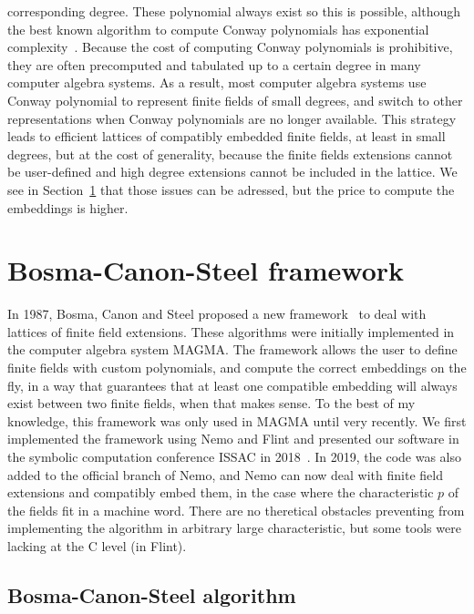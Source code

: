 corresponding degree. These polynomial always exist so this is possible,
although the best known algorithm to compute Conway polynomials has exponential
complexity~\cite{HL98}. Because the cost of computing Conway polynomials is
prohibitive, they are often precomputed and tabulated up to a certain degree in
many computer algebra systems. As a result, most computer algebra systems use
Conway polynomial to represent finite fields of small degrees, and switch to
other representations when Conway polynomials are no longer available. This
strategy leads to efficient lattices of compatibly embedded finite fields, at
least in small degrees, but at the cost of generality, because the finite fields
extensions cannot be user-defined and high degree extensions cannot be included
in the lattice. We see in Section~\ref{sec:bosma-canon-steel} that those issues
can be adressed, but the price to compute the embeddings is higher.

\section{Bosma-Canon-Steel framework}
\label{sec:bosma-canon-steel}

In 1987, Bosma, Canon and Steel proposed a new framework~\cite{BCS97} to deal
with lattices of finite field extensions. These algorithms were initially
implemented in the computer algebra system MAGMA. The framework allows the user
to define finite fields with custom polynomials, and compute the
correct embeddings on the fly, in a way that guarantees that at least one
compatible embedding will always exist between two finite fields, when that
makes sense. To the best of my knowledge, this framework was only used in MAGMA
until very recently. We first implemented the framework using Nemo and Flint and
presented our software in the symbolic computation conference ISSAC in
2018~\cite{DRR18}. In 2019, the code was also added to the official branch of
Nemo, and Nemo can now deal with finite field extensions and compatibly embed
them, in the case where the characteristic $p$ of the fields fit in a machine
word. There are no theretical obstacles preventing from implementing the algorithm in arbitrary
large characteristic, but some tools were lacking at the C level (\ie in
Flint).

\subsection{Bosma-Canon-Steel algorithm}
